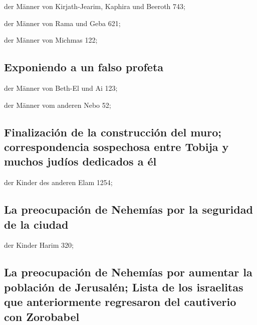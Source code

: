  der Männer von Kirjath-Jearim, Kaphira und Beeroth 743;

 der Männer von Rama und Geba 621;

 der Männer von Michmas 122;

\hypertarget{exponiendo-a-un-falso-profeta}{%
\subsection{Exponiendo a un falso
profeta}\label{exponiendo-a-un-falso-profeta}}

 der Männer von Beth-El und Ai 123;

 der Männer vom anderen Nebo 52;

\hypertarget{finalizaciuxf3n-de-la-construcciuxf3n-del-muro-correspondencia-sospechosa-entre-tobija-y-muchos-juduxedos-dedicados-a-uxe9l}{%
\subsection{Finalización de la construcción del muro; correspondencia
sospechosa entre Tobija y muchos judíos dedicados a
él}\label{finalizaciuxf3n-de-la-construcciuxf3n-del-muro-correspondencia-sospechosa-entre-tobija-y-muchos-juduxedos-dedicados-a-uxe9l}}

 der Kinder des anderen Elam 1254;

\hypertarget{la-preocupaciuxf3n-de-nehemuxedas-por-la-seguridad-de-la-ciudad}{%
\subsection{La preocupación de Nehemías por la seguridad de la
ciudad}\label{la-preocupaciuxf3n-de-nehemuxedas-por-la-seguridad-de-la-ciudad}}

 der Kinder Harim 320;

\hypertarget{la-preocupaciuxf3n-de-nehemuxedas-por-aumentar-la-poblaciuxf3n-de-jerusaluxe9n-lista-de-los-israelitas-que-anteriormente-regresaron-del-cautiverio-con-zorobabel}{%
\subsection{La preocupación de Nehemías por aumentar la población de
Jerusalén; Lista de los israelitas que anteriormente regresaron del
cautiverio con
Zorobabel}\label{la-preocupaciuxf3n-de-nehemuxedas-por-aumentar-la-poblaciuxf3n-de-jerusaluxe9n-lista-de-los-israelitas-que-anteriormente-regresaron-del-cautiverio-con-zorobabel}}

